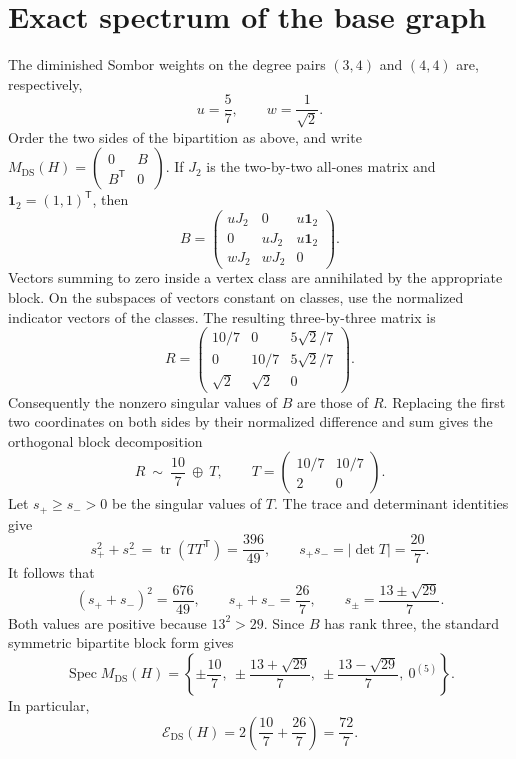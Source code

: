 \documentclass[11pt]{article}
\newcommand{\DS}{\mathrm{DS}}
\newcommand{\E}{\mathcal E_{\DS}}
\begin{document}
\section*{Exact spectrum of the base graph}
The diminished Sombor weights on the degree pairs \((3,4)\) and \((4,4)\)
are, respectively,
\[
 u=\frac57,\qquad w=\frac1{\sqrt2}.
\]
Order the two sides of the bipartition as above, and write
\(M_{\DS}(H)=\left(\begin{smallmatrix}0&B\\B^{\mathsf T}&0\end{smallmatrix}\right)\).
If \(J_2\) is the two-by-two all-ones matrix and
\(\mathbf1_2=(1,1)^{\mathsf T}\), then
\[
 B=\begin{pmatrix}
 uJ_2&0&u\mathbf1_2\\
 0&uJ_2&u\mathbf1_2\\
 wJ_2&wJ_2&0
 \end{pmatrix}.
\]
Vectors summing to zero inside a vertex class are annihilated by the
appropriate block. On the subspaces of vectors constant on classes,
use the normalized indicator vectors of the classes. The resulting
three-by-three matrix is
\[
 R=\begin{pmatrix}
 10/7&0&5\sqrt2/7\\
 0&10/7&5\sqrt2/7\\
 \sqrt2&\sqrt2&0
 \end{pmatrix}.
\]
Consequently the nonzero singular values of \(B\) are those of \(R\).
Replacing the first two coordinates on both sides by their normalized
difference and sum gives the orthogonal block decomposition
\[
 R\ \sim\ \frac{10}{7}\ \oplus\ T,
 \qquad
 T=\begin{pmatrix}10/7&10/7\\2&0\end{pmatrix}.
\]
Let \(s_+\ge s_->0\) be the singular values of \(T\).
The trace and determinant identities give
\[
 s_+^2+s_-^2=\operatorname{tr}(TT^{\mathsf T})=\frac{396}{49},
 \qquad s_+s_-=|\det T|=\frac{20}{7}.
\]
It follows that
\[
 (s_++s_-)^2=\frac{676}{49},\qquad
 s_++s_-=\frac{26}{7},\qquad
 s_\pm=\frac{13\pm\sqrt{29}}7.
\]
Both values are positive because \(13^2>29\). Since \(B\) has rank three,
the standard symmetric bipartite block form gives
\[
 \operatorname{Spec}M_{\DS}(H)
 =\left\{\pm\frac{10}7,\
          \pm\frac{13+\sqrt{29}}7,\
          \pm\frac{13-\sqrt{29}}7,\ 0^{(5)}\right\}.
\]
In particular,
\[
 \E(H)=2\left(\frac{10}7+\frac{26}7\right)=\frac{72}7.
\]
\end{document}

